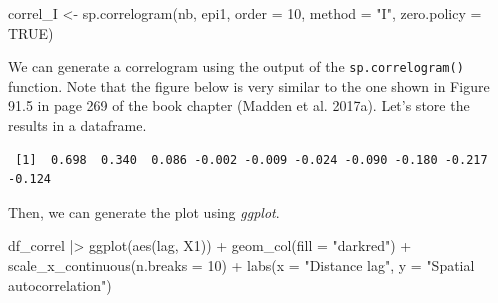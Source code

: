 \documentclass[
  letterpaper,
  DIV=11,
  numbers=noendperiod]{scrreprt}
\newenvironment{Shaded}{\begin{snugshade}}{\end{snugshade}}
\newcommand{\AttributeTok}[1]{\textcolor[rgb]{0.40,0.45,0.13}{#1}}
\newcommand{\CommentTok}[1]{\textcolor[rgb]{0.37,0.37,0.37}{#1}}
\newcommand{\ConstantTok}[1]{\textcolor[rgb]{0.56,0.35,0.01}{#1}}
\newcommand{\DecValTok}[1]{\textcolor[rgb]{0.68,0.00,0.00}{#1}}
\newcommand{\FunctionTok}[1]{\textcolor[rgb]{0.28,0.35,0.67}{#1}}
\newcommand{\NormalTok}[1]{\textcolor[rgb]{0.00,0.23,0.31}{#1}}
\newcommand{\OtherTok}[1]{\textcolor[rgb]{0.00,0.23,0.31}{#1}}
\newcommand{\SpecialCharTok}[1]{\textcolor[rgb]{0.37,0.37,0.37}{#1}}
\newcommand{\StringTok}[1]{\textcolor[rgb]{0.13,0.47,0.30}{#1}}
\begin{document}
\begin{Shaded}
\begin{Highlighting}[]
\NormalTok{correl\_I }\OtherTok{\textless{}{-}} \FunctionTok{sp.correlogram}\NormalTok{(nb, epi1, }
                           \AttributeTok{order =} \DecValTok{10}\NormalTok{,}
                           \AttributeTok{method =} \StringTok{"I"}\NormalTok{,  }
                           \AttributeTok{zero.policy =} \ConstantTok{TRUE}\NormalTok{)}
\end{Highlighting}
\end{Shaded}

We can generate a correlogram using the output of the
\texttt{sp.correlogram()} function. Note that the figure below is very
similar to the one shown in Figure 91.5 in page 269 of the book chapter
(Madden et al. 2017a). Let's store the results in a dataframe.

\begin{Shaded}
\end{Shaded}

\begin{verbatim}
 [1]  0.698  0.340  0.086 -0.002 -0.009 -0.024 -0.090 -0.180 -0.217 -0.124
\end{verbatim}

Then, we can generate the plot using \emph{ggplot}.

\begin{Shaded}
\begin{Highlighting}[]
\NormalTok{df\_correl }\SpecialCharTok{|\textgreater{}}
  \FunctionTok{ggplot}\NormalTok{(}\FunctionTok{aes}\NormalTok{(lag, X1)) }\SpecialCharTok{+}
  \FunctionTok{geom\_col}\NormalTok{(}\AttributeTok{fill =} \StringTok{"darkred"}\NormalTok{) }\SpecialCharTok{+}
  \FunctionTok{scale\_x\_continuous}\NormalTok{(}\AttributeTok{n.breaks =} \DecValTok{10}\NormalTok{) }\SpecialCharTok{+}
  \FunctionTok{labs}\NormalTok{(}\AttributeTok{x =} \StringTok{"Distance lag"}\NormalTok{, }\AttributeTok{y =} \StringTok{"Spatial autocorrelation"}\NormalTok{)}
\end{Highlighting}
\end{Shaded}
\end{document}
